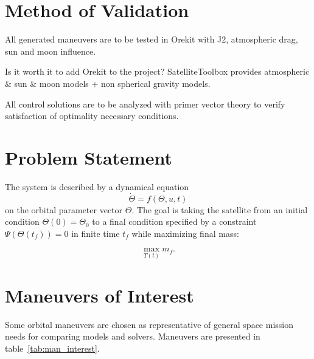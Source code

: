 \section{Method of Validation}

All generated maneuvers are to be tested in Orekit with J2, atmospheric drag, sun and moon influence.

Is it worth it to add Orekit to the project? SatelliteToolbox provides atmospheric \& sun \& moon models + non spherical gravity models.

All control solutions are to be analyzed with primer vector theory to verify satisfaction of optimality necessary conditions.

\section{Problem Statement}

The system is described by a dynamical equation
\begin{equation} \label{eq:dynamics}
    \dot \Theta = f(\Theta, u, t)
\end{equation}
on the orbital parameter vector \(\Theta\). The goal is taking the satellite from an initial condition \(\Theta(0) = \Theta_0\) to a final condition specified by a constraint \(\Psi(\Theta(t_f)) = 0\) in finite time \(t_f\) while maximizing final mass:

\begin{equation} \label{eq:max_m}
    \max_{T(t)} m_f.
\end{equation}

\section{Maneuvers of Interest}

Some orbital maneuvers are chosen as representative of general space mission needs for comparing models and solvers. Maneuvers are presented in table~\ref{tab:man_interest}. 

